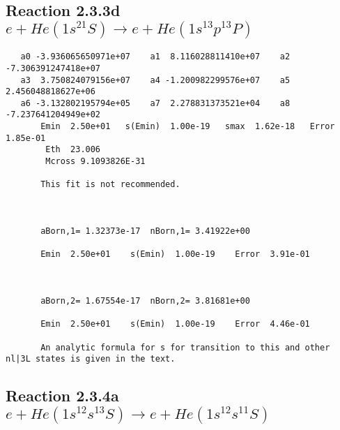 \documentclass[12pt,dvipdfm]{article}
\begin{document}
\newpage
\subsection{
Reaction 2.3.3d $e + He(1s^21S) \rightarrow e + He(1s^13p^13P)$}

















\begin{small}\begin{verbatim}
   a0 -3.936065650971e+07    a1  8.116028811410e+07    a2 -7.306391247418e+07
   a3  3.750824079156e+07    a4 -1.200982299576e+07    a5  2.456048818627e+06
   a6 -3.132802195794e+05    a7  2.278831373521e+04    a8 -7.237641204949e+02
       Emin  2.50e+01   s(Emin)  1.00e-19   smax  1.62e-18   Error  1.85e-01
        Eth  23.006
        Mcross 9.1093826E-31

       This fit is not recommended.



       aBorn,1= 1.32373e-17  nBorn,1= 3.41922e+00

       Emin  2.50e+01    s(Emin)  1.00e-19    Error  3.91e-01



       aBorn,2= 1.67554e-17  nBorn,2= 3.81681e+00

       Emin  2.50e+01    s(Emin)  1.00e-19    Error  4.46e-01

       An analytic formula for s for transition to this and other nl|3L states is given in the text.
\end{verbatim}\end{small}




\newpage
\subsection{
Reaction 2.3.4a $e + He(1s^12s^13S) \rightarrow e + He(1s^12s^11S)$}






\end{document}
